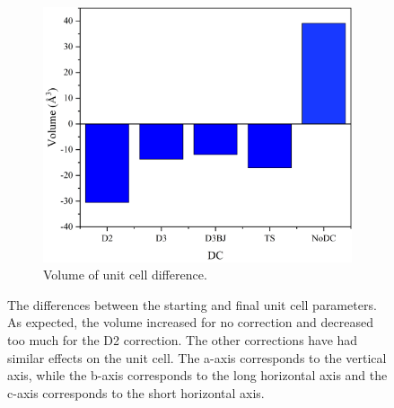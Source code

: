 \begin{figure}[!htb]
\begin{subfigure}{0.49\textwidth}
\centering
\includegraphics[width=\textwidth]{Figures/Analysis/IVDW/volchangebar.png}
\caption{Volume of unit cell difference.}
\label{fig:volchange}
\end{subfigure}

\captionsetup{font = footnotesize, justification = centering}
\caption[Differences between the Starting and Final Unit Cell Parameters]{The differences between the starting and final unit cell parameters. As expected, the volume increased for no correction and decreased too much for the D2 correction. The other corrections have had similar effects on the unit cell. The a\nobreakdash-axis corresponds to the vertical axis, while the b\nobreakdash-axis corresponds to the long horizontal axis and the c\nobreakdash-axis corresponds to the short horizontal axis.}
\label{Fig:UnitCellParams}
\end{figure}

